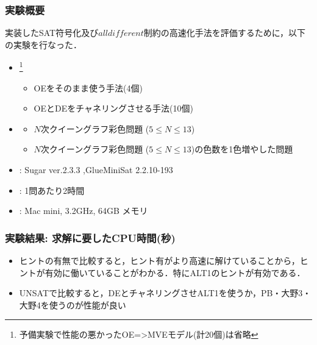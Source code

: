 \documentclass [dvipdfmx,11pt]{beamer}
\newcommand{\alldifferent}{$alldifferent$}
\begin{document}
\begin{frame}
    \frametitle{実験概要}
    実装したSAT符号化及び{\alldifferent}制約の高速化手法を評価するために，以下の実験を行なった．
    \begin{itemize}
        \item {}\footnote{予備実験で性能の悪かったOE={\textgreater}MVEモデル(計20個)は省略}\\
            \begin{itemize}
                \item OEをそのまま使う手法(4個)
                \item OEとDEをチャネリングさせる手法(10個)
            \end{itemize}
        \item {}
            \begin{itemize}
                \item $N$次クイーングラフ彩色問題 ($5\leq N\leq 13$)
                \item $N$次クイーングラフ彩色問題 ($5\leq N\leq 13$)の色数を1色増やした問題
            \end{itemize}
        \item {}: Sugar ver.2.3.3 ,GlueMiniSat 2.2.10-193
        \item {}: 1問あたり2時間
        \item {}: Mac mini, 3.2GHz, 64GB メモリ
    \end{itemize}
\end{frame}



\begin{frame}
    \frametitle{実験結果: 求解に要したCPU時間(秒)}
    \begin{block}{}\centering
        {\tiny }
    \end{block}
    \begin{itemize}
        \item ヒントの有無で比較すると，ヒント有がより高速に解けていることから，ヒントが有効に働いていることがわかる．特にALT1のヒントが有効である．
        \item UNSATで比較すると，DEとチャネリングさせALT1を使うか，PB・大野3・大野4を使うのが性能が良い
    \end{itemize}
\end{frame}
\end{document}
